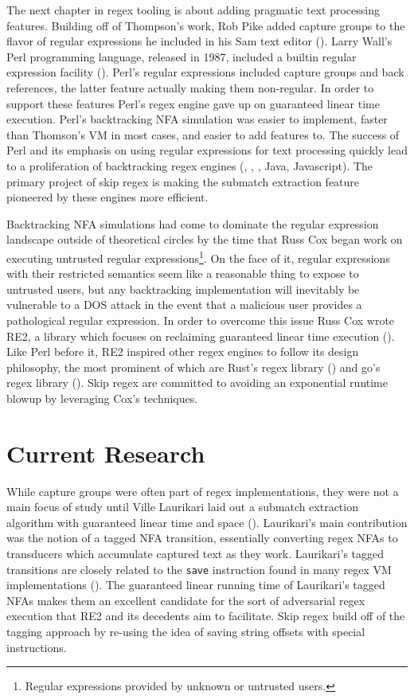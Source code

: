 The next chapter in regex tooling is about adding pragmatic text
processing features. Building off of Thompson's work,
Rob Pike added capture groups to the flavor of regular expressions
he included in his Sam text editor (\cite{Pike1987}). Larry Wall's
Perl programming language, released in 1987, included a builtin
regular expression facility (\cite{Perl}). Perl's regular
expressions included capture groups and back references, the
latter feature actually making them non-regular. In order to
support these features Perl's regex engine gave up on guaranteed
linear time execution. Perl's backtracking NFA
simulation was easier to implement, faster than Thomson's VM in most
cases, and easier to add features to. The success of Perl and its
emphasis on using regular expressions for text processing quickly
lead to a proliferation of backtracking regex engines (\cite{PCRE},
\cite{PCRE2}, \cite{Python}, Java, Javascript). The primary
project of skip regex is making the submatch extraction feature
pioneered by these engines more efficient.

Backtracking NFA simulations had come to dominate the regular
expression landscape outside of theoretical circles by the
time that Russ Cox began work on executing untrusted regular
expressions\footnote{Regular expressions provided by unknown
or untrusted users.}. On the face of it, regular expressions with their
restricted semantics seem like a reasonable thing to expose to
untrusted users, but any backtracking implementation will inevitably
be vulnerable to a DOS attack in the event that a malicious user
provides a pathological regular expression. In order to
overcome this issue Russ Cox wrote RE2, a library
which focuses on reclaiming guaranteed linear time execution (\cite{CoxRE2}).
Like Perl before it, RE2 inspired other regex engines to
follow its design philosophy, the most prominent of which are
Rust's regex library (\cite{GallantRegex}) and go's regex library
(\cite{GoLang}). Skip regex are committed to avoiding an
exponential runtime blowup by leveraging Cox's techniques.

\section{Current Research}

While capture groups were often part of regex implementations,
they were not a main focus of study until Ville Laurikari laid
out a submatch extraction algorithm with guaranteed linear time
and space (\cite{Laurikari2001}). Laurikari's main contribution
was the notion of a tagged NFA transition, essentially converting
regex NFAs to transducers which accumulate captured text as they
work. Laurikari's tagged transitions are closely related to the
\verb'save' instruction found in many regex VM implementations
(\cite{CoxVirtualMachineApproach}). The guaranteed linear
running time of Laurikari's tagged NFAs makes them an excellent
candidate for the sort of adversarial regex execution that RE2
and its decedents aim to facilitate. Skip regex build off of
the tagging approach by re-using the idea of saving string offsets
with special instructions.

